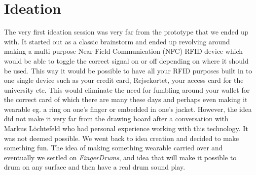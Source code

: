 \chapter{Ideation}
\label{Ideation}
The very first ideation session was very far from the prototype that we ended up with. It started out as a classic brainstorm and ended up revolving around making a multi-purpose Near Field Communication (NFC) RFID device which would be able to toggle the correct signal on or off depending on where it should be used. This way it would be possible to have all your RFID purposes built in to one single device such as your credit card, Rejsekortet, your access card for the university etc. This would eliminate the need for fumbling around your wallet for the correct card of which there are many these days and perhaps even making it wearable eg. a ring on one's finger or embedded in one's jacket. However, the idea did not make it very far from the drawing board after a conversation with Markus Löchtefeld who had personal experience working with this technology. It was not deemed possible. We went back to idea creation and decided to make something fun. The idea of making something wearable carried over and eventually we settled on \textit{FingerDrums}, and idea that will make it possible to drum on any surface and then have a real drum sound play. 


